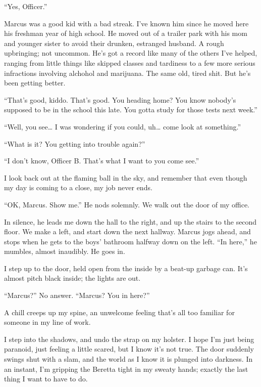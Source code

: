 ``Yes, Officer.''



Marcus was a good kid with a bad streak. I've known him since he
moved here his freshman year of high school. He moved out of a
trailer park with his mom and younger sister to avoid their
drunken, estranged husband. A rough upbringing; not uncommon. He's
got a record like many of the others I've helped, ranging from
little things like skipped classes and tardiness to a few more
serious infractions involving alchohol and marijuana. The same old,
tired shit. But he's been getting better.



``That's good, kiddo. That's good. You heading home? You know
nobody's supposed to be in the school this late. You gotta study
for those tests next week.''

``Well, you see{\ldots} I was wondering if you could, uh{\ldots} come look at
something.''

``What is it? You getting into trouble again?''

``I don't know, Officer B. That's what I want to you come
see.''



I look back out at the flaming ball in the sky, and remember that
even though my day is coming to a close, my job never ends.



``OK, Marcus. Show me.'' He nods solemnly. We walk out the door of my
office.



In silence, he leads me down the hall to the right, and up the
stairs to the second floor. We make a left, and start down the next
hallway. Marcus jogs ahead, and stops when he gets to the boys'
bathroom halfway down on the left. ``In here,'' he mumbles, almost
inaudibly. He goes in.



I step up to the door, held open from the inside by a beat-up
garbage can. It's almost pitch black inside; the lights are
out.



``Marcus?'' No answer. ``Marcus? You in here?''



A chill creeps up my spine, an unwelcome feeling that's all too
familiar for someone in my line of work.



I step into the shadows, and undo the strap on my holster. I hope
I'm just being paranoid, just feeling a little scared, but I know
it's not true. The door suddenly swings shut with a slam, and the
world as I know it is plunged into darkness. In an instant, I'm
gripping the Beretta tight in my sweaty hands; exactly the last
thing I want to have to do.



